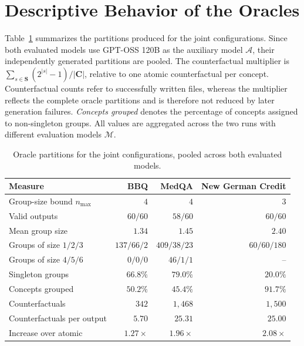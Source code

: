 \section{Descriptive Behavior of the Oracles}
\label{sec:results-oracle-behavior}

Table~\ref{tab:oracle-summary} summarizes the partitions produced for the joint configurations. Since both evaluated models use GPT-OSS 120B as the auxiliary model $\mathcal{A}$, their independently generated partitions are pooled. The counterfactual multiplier is $\sum_{s\in\mathbf{S}}(2^{|s|}-1)/|\mathbf{C}|$, relative to one atomic counterfactual per concept. Counterfactual counts refer to successfully written files, whereas the multiplier reflects the complete oracle partitions and is therefore not reduced by later generation failures. \emph{Concepts grouped} denotes the percentage of concepts assigned to non-singleton groups. All values are aggregated across the two runs with different evaluation models $\mathcal{M}$.

\begin{table}[htb]
  \centering
  \caption[Oracle partitions for the joint configurations]{Oracle partitions for the joint configurations, pooled across both evaluated models.}
  \label{tab:oracle-summary}
  \small
  \setlength{\tabcolsep}{6pt}
  \renewcommand{\arraystretch}{1.1}
  \begin{tabular}{@{}lrrr@{}}
    \hline
    \textbf{Measure}           & \textbf{BBQ}    & \textbf{MedQA}    & \textbf{New German Credit} \\
    \hline
    Group-size bound $n_{\max}$ & $4$             & $4$               & $3$                        \\
    Valid outputs              & $60/60$         & $58/60$           & $60/60$                    \\
    Mean group size            & $1.34$          & $1.45$            & $2.40$                     \\
    Groups of size $1/2/3$     & $137/66/2$      & $409/38/23$       & $60/60/180$                \\
    Groups of size $4/5/6$     & $0/0/0$         & $46/1/1$          & --                         \\
    Singleton groups           & $66.8\%$        & $79.0\%$          & $20.0\%$                   \\
    Concepts grouped           & $50.2\%$        & $45.4\%$          & $91.7\%$                   \\
    Counterfactuals            & $342$           & $1{,}468$         & $1{,}500$                  \\
    Counterfactuals per output & $5.70$          & $25.31$           & $25.00$                    \\
    Increase over atomic       & $1.27\times$    & $1.96\times$      & $2.08\times$               \\
    \hline
  \end{tabular}
\end{table}

